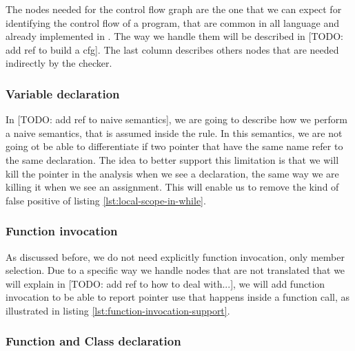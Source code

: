 The nodes needed for the control flow graph are the one that we can expect for identifying the control flow of a program, that are common in all language and already implemented in \slang. 
The way we handle them will be described in [TODO: add ref to build a cfg].
The last column describes others nodes that are needed indirectly by the checker.

\subsubsection{Variable declaration}
\label{subsubsec:variable_declaration}



In [TODO: add ref to naive semantics], we are going to describe how we perform a naive semantics, that is assumed inside the rule.
In this semantics, we are not going ot be able to differentiate if two pointer that have the same name refer to the same declaration. 
The idea to better support this limitation is that we will kill the pointer in the analysis when we see a declaration, the same way we are killing it when we see an assignment.
This will enable us to remove the kind of false positive of listing \ref{lst:local-scope-in-while}.

\subsubsection{Function invocation}
\label{subsubsec:function_invocation}



As discussed before, we do not need explicitly function invocation, only member selection. 
Due to a specific way we handle nodes that are not translated that we will explain in [TODO: add ref to how to deal with...], we will add function invocation to be able to report pointer use that happens inside a function call, as illustrated in listing \ref{lst:function-invocation-support}.

\subsubsection{Function and Class declaration}
\label{subsubsec:function_class_declaration}

